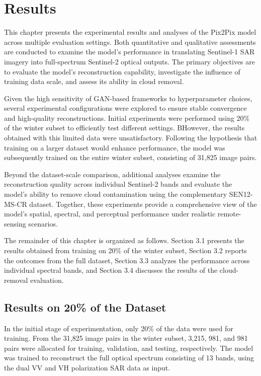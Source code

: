 \chapter{Results}
This chapter presents the experimental results and analyses of the Pix2Pix model across multiple evaluation settings. Both quantitative and qualitative assessments are conducted to examine the model’s performance in translating Sentinel-1 SAR imagery into full-spectrum Sentinel-2 optical outputs. The primary objectives are to evaluate the model’s reconstruction capability, investigate the influence of training data scale, and assess its ability in cloud removal.

Given the high sensitivity of GAN-based frameworks to hyperparameter choices, several experimental configurations were explored to ensure stable convergence and high-quality reconstructions. Initial experiments were performed using 20\% of the winter subset to efficiently test different settings. BHowever, the results obtained with this limited data were unsatisfactory. Following the hypothesis that training on a larger dataset would enhance performance, the model was subsequently trained on the entire winter subset, consisting of 31,825 image pairs.

Beyond the dataset-scale comparison, additional analyses examine the reconstruction quality across individual Sentinel-2 bands and evaluate the model’s ability to remove cloud contamination using the complementary SEN12-MS-CR dataset. Together, these experiments provide a comprehensive view of the model’s spatial, spectral, and perceptual performance under realistic remote-sensing scenarios.

The remainder of this chapter is organized as follows. Section 3.1 presents the results obtained from training on 20\% of the winter subset, Section 3.2 reports the outcomes from the full dataset, Section 3.3 analyzes the performance across individual spectral bands, and Section 3.4 discusses the results of the cloud-removal evaluation.

\section{Results on 20\% of the Dataset}
In the initial stage of experimentation, only 20\% of the data were used for training. From the 31,825 image pairs in the winter subset, 3,215, 981, and 981 pairs were allocated for training, validation, and testing, respectively. The model was trained to reconstruct the full optical spectrum consisting of 13 bands, using the dual VV and VH polarization SAR data as input.


